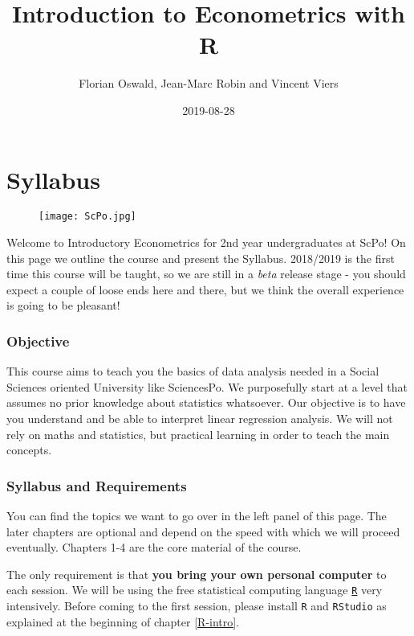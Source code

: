 \documentclass[]{book}
\title{Introduction to Econometrics with R}
\author{Florian Oswald, Jean-Marc Robin and Vincent Viers}
\date{2019-08-28}
\begin{document}
\maketitle

{
\setcounter{tocdepth}{1}
\tableofcontents
}
\chapter*{Syllabus}\label{syllabus}

\begin{figure}
\centering
\texttt{[image: ScPo.jpg]}
\caption{}
\end{figure}

Welcome to Introductory Econometrics for 2nd year undergraduates at
ScPo! On this page we outline the course and present the Syllabus.
2018/2019 is the first time this course will be taught, so we are still
in a \emph{beta} release stage - you should expect a couple of loose
ends here and there, but we think the overall experience is going to be
pleasant!

\subsection*{Objective}\label{objective}

This course aims to teach you the basics of data analysis needed in a
Social Sciences oriented University like SciencesPo. We purposefully
start at a level that assumes no prior knowledge about statistics
whatsoever. Our objective is to have you understand and be able to
interpret linear regression analysis. We will not rely on maths and
statistics, but practical learning in order to teach the main concepts.

\subsection*{Syllabus and Requirements}\label{syllabus-and-requirements}

You can find the topics we want to go over in the left panel of this
page. The later chapters are optional and depend on the speed with which
we will proceed eventually. Chapters 1-4 are the core material of the
course.

The only requirement is that \textbf{you bring your own personal
computer} to each session. We will be using the free statistical
computing language \href{https://www.r-project.org}{\texttt{R}} very
intensively. Before coming to the first session, please install
\texttt{R} and \texttt{RStudio} as explained at the beginning of chapter
\ref{R-intro}.
\end{document}
